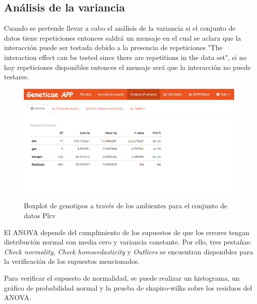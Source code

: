 \subsection{Análisis de la variancia}

Cuando se pretende llevar a cabo el análisis de la variancia si el conjunto de datos tiene repeticiones entonces saldrá un mensaje en el cual se aclara que la interacción puede ser testada debido a la presencia de repeticiones "The interaction effect can be tested since there are repetitions in the data set", si no hay repeticiones disponibles entonces el mensaje será que la interacción no puede testarse.

\begin{figure}[H]
	\begin{center}
		\includegraphics[width=17cm]{./Graficos/ANOVA.png}
	\end{center}
	\caption{Boxplot de genotipos a través de los ambientes para el conjunto de datos Plrv}
	\label{fig:fig49}
\end{figure}


El ANOVA depende del cumplimiento de los supuestos de que los errores tengan distribución normal con media cero y variancia constante. Por ello, tres pestañas: \emph{Check normality}, \emph{Check homocedasticity} y \emph{Outliers} se encuentran disponibles para la verificación de los supuestos mencionados.

Para verificar el supuesto de normalidad, se puede realizar un histograma, un gráfico de probabilidad normal y la prueba de shapiro-wilks sobre los residuos del ANOVA.

